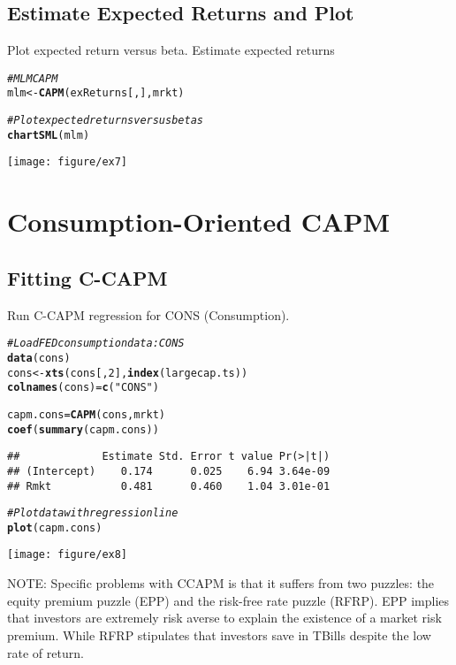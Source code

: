 \documentclass[a4paper]{article}\usepackage[]{graphicx}\usepackage[]{color}
\makeatletter
\def\maxwidth{ %
  \ifdim\Gin@nat@width>\linewidth
    \linewidth
  \else
    \Gin@nat@width
  \fi
}
\newcommand{\hlnum}[1]{\textcolor[rgb]{0.686,0.059,0.569}{#1}}%
\newcommand{\hlstr}[1]{\textcolor[rgb]{0.192,0.494,0.8}{#1}}%
\newcommand{\hlcom}[1]{\textcolor[rgb]{0.678,0.584,0.686}{\textit{#1}}}%
\newcommand{\hlstd}[1]{\textcolor[rgb]{0.345,0.345,0.345}{#1}}%
\newcommand{\hlkwb}[1]{\textcolor[rgb]{0.69,0.353,0.396}{#1}}%
\newcommand{\hlkwd}[1]{\textcolor[rgb]{0.737,0.353,0.396}{\textbf{#1}}}%
\newenvironment{kframe}{%
 \def\at@end@of@kframe{}%
 \ifinner\ifhmode%
  \def\at@end@of@kframe{\end{minipage}}%
  \begin{minipage}{\columnwidth}%
 \fi\fi%
 \def\FrameCommand##1{\hskip\@totalleftmargin \hskip-\fboxsep
 \colorbox{shadecolor}{##1}\hskip-\fboxsep
     \hskip-\linewidth \hskip-\@totalleftmargin \hskip\columnwidth}%
 \MakeFramed {\advance\hsize-\width
   \@totalleftmargin\z@ \linewidth\hsize
   \@setminipage}}%
 {\par\unskip\endMakeFramed%
 \at@end@of@kframe}
\newenvironment{knitrout}{}{} %
\makeatother
\begin{document}
\subsection{Estimate Expected Returns and Plot}
Plot expected return versus beta.
Estimate expected returns
\begin{knitrout}
\color{fgcolor}\begin{kframe}
\begin{alltt}
\hlcom{# MLM CAPM}
\hlstd{mlm} \hlkwb{<-} \hlkwd{CAPM}\hlstd{(exReturns[, ], mrkt)}

\hlcom{# Plot expected returns versus betas}
\hlkwd{chartSML}\hlstd{(mlm)}
\end{alltt}
\end{kframe}
\texttt{[image: figure/ex7]} 

\end{knitrout}


\section{Consumption-Oriented CAPM}
\subsection{Fitting C-CAPM}
Run C-CAPM regression for CONS (Consumption).
\begin{knitrout}
\color{fgcolor}\begin{kframe}
\begin{alltt}
\hlcom{# Load FED consumption data: CONS}
\hlkwd{data}\hlstd{(cons)}
\hlstd{cons} \hlkwb{<-} \hlkwd{xts}\hlstd{(cons[,} \hlnum{2}\hlstd{],} \hlkwd{index}\hlstd{(largecap.ts))}
\hlkwd{colnames}\hlstd{(cons)} \hlkwb{=} \hlkwd{c}\hlstd{(}\hlstr{"CONS"}\hlstd{)}

\hlstd{capm.cons} \hlkwb{=} \hlkwd{CAPM}\hlstd{(cons, mrkt)}
\hlkwd{coef}\hlstd{(}\hlkwd{summary}\hlstd{(capm.cons))}
\end{alltt}
\begin{verbatim}
##             Estimate Std. Error t value Pr(>|t|)
## (Intercept)    0.174      0.025    6.94 3.64e-09
## Rmkt           0.481      0.460    1.04 3.01e-01
\end{verbatim}
\begin{alltt}
\hlcom{# Plot data with regression line}
\hlkwd{plot}\hlstd{(capm.cons)}
\end{alltt}
\end{kframe}
\texttt{[image: figure/ex8]} 

\end{knitrout}

NOTE: Specific problems with CCAPM is that it suffers from two puzzles: the equity premium puzzle (EPP) and the risk-free rate puzzle (RFRP). EPP implies that investors are extremely risk averse to explain the existence of a market risk premium. While RFRP stipulates that investors save in TBills despite the low rate of return.
\end{document}
